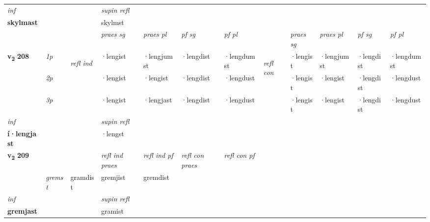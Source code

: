 \begin{longtable}[l]{X>{\footnotesize\itshape}llXXXXlXXXX}
   {\textit{inf}} & &       & \textit{supin refl}  \\*
  {\textbf{skylmast}} & &       & skylmst  \\*

\midrule

 & &   & \textit{praes sg}  & \textit{praes pl}    & \textit{ pf sg} & \textit{pf pl} & & \textit{praes sg}  & \textit{praes pl}    & \textit{pf sg} & \textit{pf pl }  \\ \cmidrule{4-7} \cmidrule{9-12}
 \multirow{2}{*}{{{\textbf{v{\textsubscript{2}}} \Large{\textbf{208}}}}}  & 1p & \multirow{3}{*}{\begin{turn}{90}\textit{refl ind}\end{turn}}  & ·lengist & ·lengjumst & ·lengdist & ·lengdumst & \multirow{3}{*}{\begin{turn}{90}\textit{refl con}\end{turn}}  &·lengist & ·lengjumst & ·lengdist & ·lengdumst \\*
 & 2p &  & ·lengist & ·lengist & ·lengdist & ·lengdust & &·lengist & ·lengist & ·lengdist & ·lengdust \\*
 & 3p  & & ·lengist & ·lengjast & ·lengdist & ·lengdust & & ·lengist & ·lengist& ·lengdist & ·lengdust \\*
\cmidrule{4-7} \cmidrule{9-12}

   {\textit{inf}} & &       & \textit{supin refl}  \\*
  {\textbf{í\allowbreak ·lengjast}} & &       & ·lengst  \\*

\midrule

\multirow{2}{*}{{{\textbf{v{\textsubscript{2}}} \Large{\textbf{209}}}}}  & &&\textit{refl ind praes} & \textit{refl ind pf} & \textit{refl con praes} & \textit{refl con pf} \\*
\multicolumn{3}{r}{\textit{e-m}}& gremst & gramdist & gremjist & gremdist \\*

\cmidrule{4-7}
   {\textit{inf}} & &       & \textit{supin refl}  \\*
  {\textbf{gremjast}} & &       & gramist  \\*

\midrule


\end{longtable}
